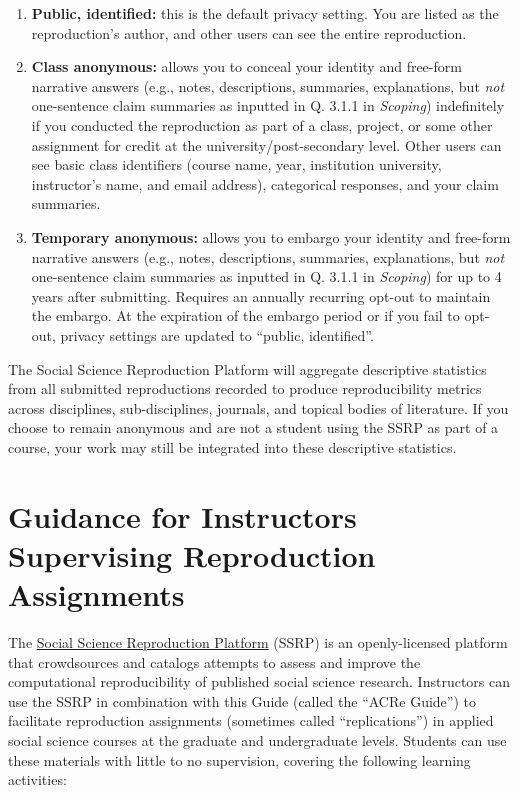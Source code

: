 \documentclass[
  openany]{book}
\begin{document}
\begin{enumerate}
\def\labelenumi{\arabic{enumi}.}
\item
  \textbf{Public, identified:} this is the default privacy setting. You are listed as the reproduction's author, and other users can see the entire reproduction.
\item
  \textbf{Class anonymous:} allows you to conceal your identity and free-form narrative answers (e.g., notes, descriptions, summaries, explanations, but \emph{not} one-sentence claim summaries as inputted in Q. 3.1.1 in \emph{Scoping}) indefinitely if you conducted the reproduction as part of a class, project, or some other assignment for credit at the university/post-secondary level. Other users can see basic class identifiers (course name, year, institution university, instructor's name, and email address), categorical responses, and your claim summaries.
\item
  \textbf{Temporary anonymous:} allows you to embargo your identity and free-form narrative answers (e.g., notes, descriptions, summaries, explanations, but \emph{not} one-sentence claim summaries as inputted in Q. 3.1.1 in \emph{Scoping}) for up to 4 years after submitting. Requires an annually recurring opt-out to maintain the embargo. At the expiration of the embargo period or if you fail to opt-out, privacy settings are updated to ``public, identified''.
\end{enumerate}

The Social Science Reproduction Platform will aggregate descriptive statistics from all submitted reproductions recorded to produce reproducibility metrics across disciplines, sub-disciplines, journals, and topical bodies of literature. If you choose to remain anonymous and are not a student using the SSRP as part of a course, your work may still be integrated into these descriptive statistics.

\hypertarget{guidance-for-instructors-supervising-reproduction-assignments}{%
\chapter{Guidance for Instructors Supervising Reproduction Assignments}\label{guidance-for-instructors-supervising-reproduction-assignments}}

The \href{https://www.socialsciencereproduction.org/}{Social Science Reproduction Platform} (SSRP) is an openly-licensed platform that crowdsources and catalogs attempts to assess and improve the computational reproducibility of published social science research. Instructors can use the SSRP in combination with this Guide (called the ``ACRe Guide'') to facilitate reproduction assignments (sometimes called ``replications'') in applied social science courses at the graduate and undergraduate levels. Students can use these materials with little to no supervision, covering the following learning activities:
\end{document}

